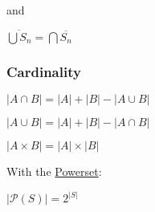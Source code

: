 \documentclass[11pt]{article}
\begin{document}
and

\(\overline{\bigcup S_n} = \bigcap{\overline{S_n}}\)

\subsubsection{Cardinality}
\label{sec:org6ef837a}

\(|A \cap B| = |A| + |B| - |A \cup B|\)

\(|A \cup B| = |A| + |B| - |A \cap B|\)

\(|A \times B| = |A| \times |B|\)

With the \href{20250118105151-powerset.org}{Powerset}:

\(|\mathcal{P}(S)| = 2^{|S|}\)
\end{document}
